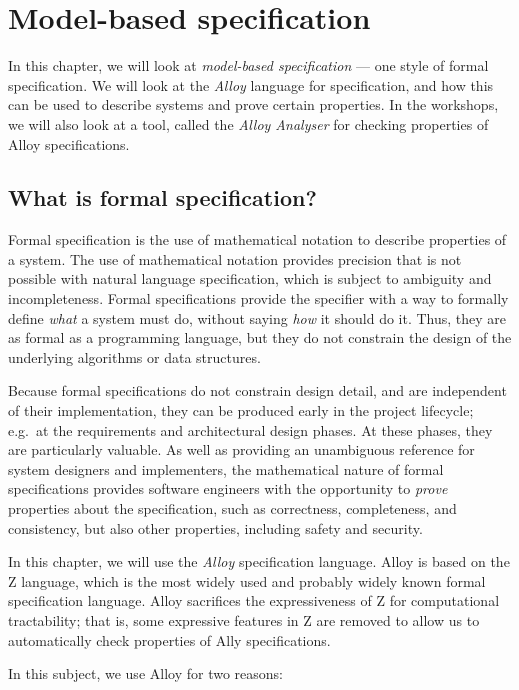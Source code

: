 \chapter{Model-based specification}
\label{chapter:specification}

In this chapter, we will look at \emph{model-based specification} --- one style of formal specification. We will look at the \emph{Alloy} language for specification, and how this can be used to describe systems and prove certain properties. In the workshops, we will also look at a tool, called the \emph{Alloy Analyser} for checking properties of Alloy specifications.

\section{What is formal specification?}

Formal specification is the use of mathematical notation to describe properties of a system. The use of mathematical notation provides precision that is not possible with natural language specification, which is subject to ambiguity and incompleteness. Formal specifications provide the specifier with a way to formally define \emph{what} a system must do, without saying \emph{how} it should do it. Thus, they are as formal as a programming language, but they do not constrain the design of the underlying algorithms or data structures.

Because formal specifications do not constrain design detail, and are independent of their implementation, they can be produced early in the project lifecycle; e.g.\ at the requirements and architectural design phases. At these phases, they are particularly valuable. As well as providing an unambiguous reference for system designers and implementers, the mathematical nature of formal specifications provides software engineers with the opportunity to \emph{prove} properties about the specification, such as correctness, completeness, and consistency, but also other properties, including safety and security.

In this chapter, we will use the \emph{Alloy} specification language. Alloy is based on the Z language, which is the most widely used and probably widely known formal specification language. Alloy sacrifices the expressiveness of Z for computational tractability; that is, some expressive features in Z are removed to allow us to automatically check properties of Ally specifications.

In this subject, we use Alloy for two reasons:


